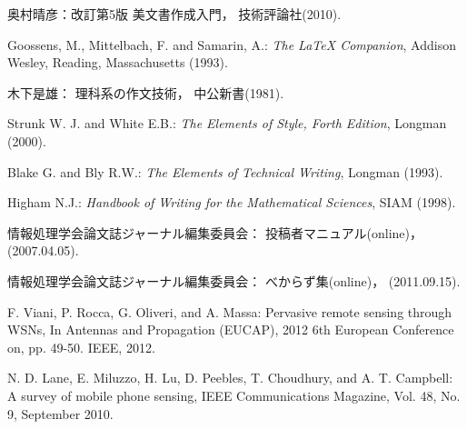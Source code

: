 \documentclass[submit,techrep]{ipsj}
\begin{document}
\begin{thebibliography}{10}



奥村晴彦：改訂第5版 \LaTeXe 美文書作成入門，
技術評論社(2010).

Goossens, M., Mittelbach, F. and Samarin, A.:
{\it The LaTeX Companion},
Addison Wesley, Reading, Massachusetts (1993).

木下是雄：
理科系の作文技術，
中公新書(1981).

Strunk W. J. and White E.B.:
{\it The Elements of Style, Forth Edition},
Longman (2000).

Blake G. and Bly R.W.:
{\it The Elements of Technical Writing},
Longman (1993).

Higham N.J.:
{\it Handbook of Writing for the Mathematical Sciences},
SIAM (1998).

情報処理学会論文誌ジャーナル編集委員会：
投稿者マニュアル(online)，
(2007.04.05).

情報処理学会論文誌ジャーナル編集委員会：
べからず集(online)，
(2011.09.15).
\fi

F. Viani, P. Rocca, G. Oliveri, and A. Massa:
Pervasive remote sensing through WSNs, In Antennas and Propagation (EUCAP), 2012 6th European Conference on, pp. 49-50. IEEE, 2012.


N. D. Lane, E. Miluzzo, H. Lu, D. Peebles, T. Choudhury, and A. T. Campbell:
A survey of mobile phone sensing,
IEEE Communications Magazine, Vol. 48, No. 9,
September 2010.



\end{thebibliography}
\end{document}
